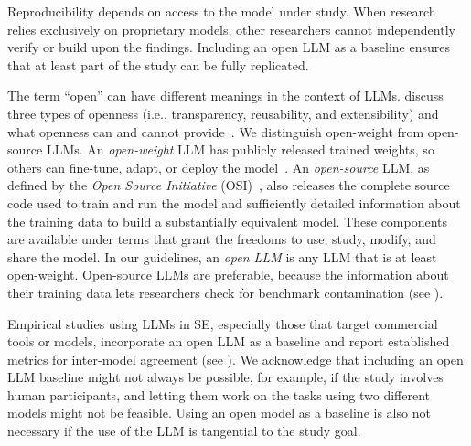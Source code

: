 
Reproducibility depends on access to the model under study.
When research relies exclusively on proprietary models, other researchers cannot independently verify or build upon the findings.
Including an open LLM as a baseline ensures that at least part of the study can be fully replicated.


The term ``open'' can have different meanings in the context of LLMs.
\citeauthor{widder2024open} discuss three types of openness (i.e., transparency, reusability, and extensibility) and what openness can and cannot provide~\cite{widder2024open}.
We distinguish open-weight from open-source LLMs.
An \emph{open-weight} LLM has publicly released trained weights, so others can fine-tune, adapt, or deploy the model~\cite{OSIOpenWeights}.
An \emph{open-source} LLM, as defined by the \emph{Open Source Initiative} (OSI)~\cite{OSIAI2024}, also releases the complete source code used to train and run the model and sufficiently detailed information about the training data to build a substantially equivalent model.
These components are available under terms that grant the freedoms to use, study, modify, and share the model.
In our guidelines, an \emph{open LLM} is any LLM that is at least open-weight.
Open-source LLMs are preferable, because the information about their training data lets researchers check for benchmark contamination (see \benchmarksmetrics).

Empirical studies using LLMs in SE, especially those that target commercial tools or models, \should incorporate an open LLM as a baseline and report established metrics for inter-model agreement (see \benchmarksmetrics).
We acknowledge that including an open LLM baseline might not always be possible, for example, if the study involves human participants, and letting them work on the tasks using two different models might not be feasible.
Using an open model as a baseline is also not necessary if the use of the LLM is tangential to the study goal.

